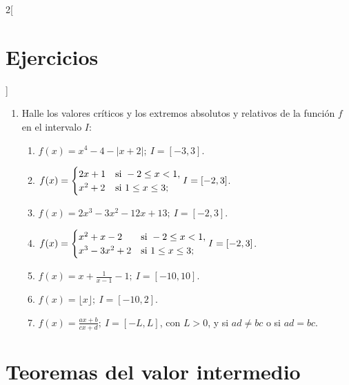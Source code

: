 \begin{multicols}{2}[\section{Ejercicios}]
\begin{enumerate}[leftmargin=*]
\item Halle los valores críticos y los extremos absolutos y relativos de la función $f$ en el
    intervalo $I$:
    \begin{enumerate}[leftmargin=*]
    \item $\displaystyle f(x) = x^4 - 4 - |x + 2|; \ I = [-3,3]$.
    \item $\displaystyle f(x) =
          \begin{cases}
            2x + 1 & \text{si } -2 \leq x < 1, \\
            x^2 + 2 & \text{si } 1 \leq x \leq 3;
          \end{cases}\\[6pt]
          I = [-2,3]$.
    \item $\displaystyle f(x) = 2x^3 - 3x^2 - 12x + 13; \ I = [-2,3]$.
    \item $\displaystyle f(x) =
          \begin{cases}
            x^2 + x - 2 & \text{si } -2 \leq x < 1, \\
            x^3 - 3x^2 + 2 & \text{si } 1 \leq x \leq 3;
          \end{cases}\\[6pt]
          I = [-2,3]$.
    \item $\displaystyle f(x) = x + \frac{1}{x - 1} - 1; \ I = [-10,10]$.
    \item $\displaystyle f(x) = \lfloor x \rfloor; \ I = [-10,2]$.
    \item $\displaystyle f(x) = \frac{ax + b}{cx + d}; \ I = [-L,L]$, con $L > 0$, y si $ad
        \neq bc$ o si $ad = bc$.
    \end{enumerate}
\end{enumerate}
\endgroup
\end{multicols}

\section{Teoremas del valor intermedio}

